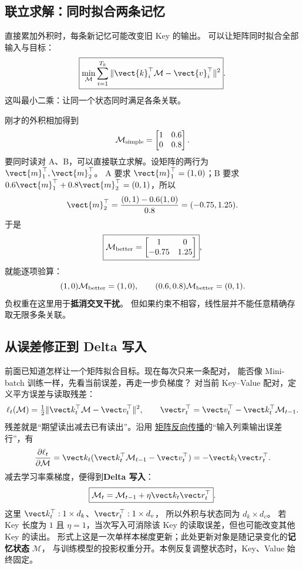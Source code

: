 \subsection{联立求解：同时拟合两条记忆}
直接累加外积时，每条新记忆可能改变旧 Key 的输出。
可以让矩阵同时拟合全部输入与目标：
\[
\boxed{\min_{\mathcal{M}}\sum_{i=1}^{T_k}\|\vect{k}_i^\top\mathcal{M}-\vect{v}_i^\top\|^2}.
\]
这叫最小二乘：让同一个状态同时满足各条关联。

刚才的外积相加得到
\[
\mathcal{M}_{\rm simple}=\begin{bmatrix}1&0.6\\0&0.8\end{bmatrix}.
\]
要同时读对 A、B，可以直接联立求解。设矩阵的两行为 $\vect{m}_1^\top,\vect{m}_2^\top$。
A 要求 $\vect{m}_1^\top=(1,0)$；B 要求 $0.6\vect{m}_1^\top+0.8\vect{m}_2^\top=(0,1)$，所以
\[
\vect{m}_2^\top=\frac{(0,1)-0.6(1,0)}{0.8}=(-0.75,1.25).
\]
于是
\[
\boxed{\mathcal{M}_{\rm better}=\begin{bmatrix}1&0\\-0.75&1.25\end{bmatrix}},
\]
就能逐项验算：
\[
(1,0)\mathcal{M}_{\rm better}=(1,0),\qquad
(0.6,0.8)\mathcal{M}_{\rm better}=(0,1).
\]
负权重在这里用于\textbf{抵消交叉干扰}。
但如果约束不相容，线性层并不能任意精确存取无限多条关联。

\subsection{从误差修正到 Delta 写入}
\label{concept:delta-rule}
前面已知道怎样让一个矩阵拟合目标。现在每次只来一条配对，
能否像 Mini-batch 训练一样，先看当前误差，再走一步负梯度？
对当前 Key--Value 配对，定义平方误差与读取残差：
\[
\ell_t(\mathcal{M})=\tfrac12\|\vect k_t^\top\mathcal{M}-\vect v_t^\top\|^2,
\qquad
\vect r_t^\top=\vect v_t^\top-\vect k_t^\top\mathcal{M}_{t-1}.
\]
残差就是“期望读出减去已有读出”。沿用
\hyperref[sec:mlp-matrix-gradient]{矩阵反向传播}的“输入列乘输出误差行”，有
\[
\frac{\partial\ell_t}{\partial\mathcal{M}}
=\vect k_t(\vect k_t^\top\mathcal{M}_{t-1}-\vect v_t^\top)
=-\vect k_t\vect r_t^\top.
\]
减去学习率乘梯度，便得到\textbf{Delta 写入}：
\[
\boxed{\mathcal{M}_t=\mathcal{M}_{t-1}+\eta\vect k_t\vect r_t^\top}.
\]
这里 $\vect k_t^\top:1\times d_k$、$\vect r_t^\top:1\times d_v$，
所以外积与状态同为 $d_k\times d_v$。
若 Key 长度为 $1$ 且 $\eta=1$，当次写入可消除该 Key 的读取误差，但也可能改变其他 Key 的读出。
形式上这是一次单样本梯度更新；此处更新对象是随记录变化的\textbf{记忆状态} $\mathcal{M}$，
与训练模型的投影权重分开。本例反复调整状态时，Key、Value 始终固定。

